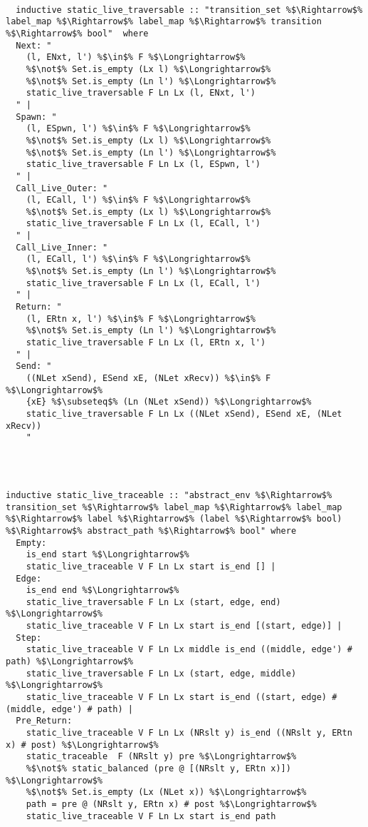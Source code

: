 \begin{lstlisting}[style=codestyle1, escapechar=\%]

  inductive static_live_traversable :: "transition_set %$\Rightarrow$% label_map %$\Rightarrow$% label_map %$\Rightarrow$% transition %$\Rightarrow$% bool"  where
  Next: "
    (l, ENxt, l') %$\in$% F %$\Longrightarrow$%
    %$\not$% Set.is_empty (Lx l) %$\Longrightarrow$%
    %$\not$% Set.is_empty (Ln l') %$\Longrightarrow$%
    static_live_traversable F Ln Lx (l, ENxt, l')
  " |
  Spawn: "
    (l, ESpwn, l') %$\in$% F %$\Longrightarrow$%
    %$\not$% Set.is_empty (Lx l) %$\Longrightarrow$%
    %$\not$% Set.is_empty (Ln l') %$\Longrightarrow$%
    static_live_traversable F Ln Lx (l, ESpwn, l')
  " |
  Call_Live_Outer: "
    (l, ECall, l') %$\in$% F %$\Longrightarrow$%
    %$\not$% Set.is_empty (Lx l) %$\Longrightarrow$%
    static_live_traversable F Ln Lx (l, ECall, l')
  " |
  Call_Live_Inner: "
    (l, ECall, l') %$\in$% F %$\Longrightarrow$%
    %$\not$% Set.is_empty (Ln l') %$\Longrightarrow$%
    static_live_traversable F Ln Lx (l, ECall, l')
  " |
  Return: "
    (l, ERtn x, l') %$\in$% F %$\Longrightarrow$%
    %$\not$% Set.is_empty (Ln l') %$\Longrightarrow$%
    static_live_traversable F Ln Lx (l, ERtn x, l')
  " |
  Send: "
    ((NLet xSend), ESend xE, (NLet xRecv)) %$\in$% F %$\Longrightarrow$%
    {xE} %$\subseteq$% (Ln (NLet xSend)) %$\Longrightarrow$%
    static_live_traversable F Ln Lx ((NLet xSend), ESend xE, (NLet xRecv))
    "
    
  \end{lstlisting}


\begin{lstlisting}[style=codestyle1, escapechar=\%]

  
inductive static_live_traceable :: "abstract_env %$\Rightarrow$% transition_set %$\Rightarrow$% label_map %$\Rightarrow$% label_map %$\Rightarrow$% label %$\Rightarrow$% (label %$\Rightarrow$% bool) %$\Rightarrow$% abstract_path %$\Rightarrow$% bool" where
  Empty:
    is_end start %$\Longrightarrow$%
    static_live_traceable V F Ln Lx start is_end [] |
  Edge:
    is_end end %$\Longrightarrow$%
    static_live_traversable F Ln Lx (start, edge, end) %$\Longrightarrow$%
    static_live_traceable V F Ln Lx start is_end [(start, edge)] |
  Step:
    static_live_traceable V F Ln Lx middle is_end ((middle, edge') # path) %$\Longrightarrow$%
    static_live_traversable F Ln Lx (start, edge, middle) %$\Longrightarrow$%
    static_live_traceable V F Ln Lx start is_end ((start, edge) # (middle, edge') # path) |
  Pre_Return:
    static_live_traceable V F Ln Lx (NRslt y) is_end ((NRslt y, ERtn x) # post) %$\Longrightarrow$%
    static_traceable  F (NRslt y) pre %$\Longrightarrow$%
    %$\not$% static_balanced (pre @ [(NRslt y, ERtn x)]) %$\Longrightarrow$%
    %$\not$% Set.is_empty (Lx (NLet x)) %$\Longrightarrow$%
    path = pre @ (NRslt y, ERtn x) # post %$\Longrightarrow$%
    static_live_traceable V F Ln Lx start is_end path
    
  \end{lstlisting}



